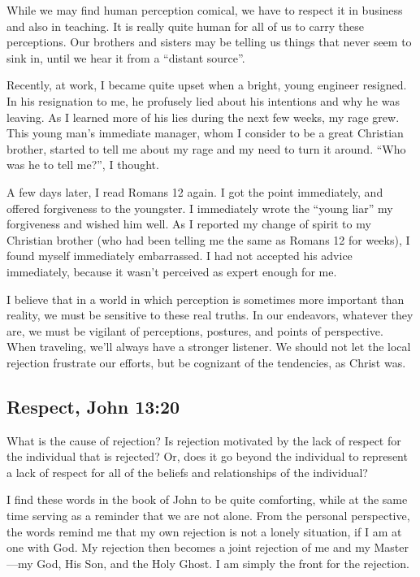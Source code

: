 \documentclass[12pt]{memoir}
\begin{document}
While we may find human perception comical, we have to respect it
in business and also in teaching. It is really quite human for all
of us to carry these perceptions. Our brothers and sisters may be
telling us things that never seem to sink in, until we hear it from
a ``distant source''.

Recently, at work, I became quite upset when a bright, young engineer resigned. In his resignation to me, he profusely lied about his intentions and why he was leaving. As I learned more of his lies during the next few weeks, my rage grew. This young man's immediate manager, whom I consider to be a great Christian brother, started to tell me about my rage and my need to turn it around. ``Who was he to tell me?'', I thought.

A few days later, I read Romans 12 again. I got the point immediately, and offered forgiveness to the youngster. I immediately wrote the ``young liar'' my forgiveness and wished him well. As I reported my change of spirit to my Christian brother (who had been telling me the same as Romans 12 for weeks), I found myself immediately embarrassed. I had not accepted his advice immediately, because it wasn't perceived as expert enough for me.

I believe that in a world in which perception is sometimes more important than reality, we must be sensitive to these real truths. In
our endeavors, whatever they are, we must be vigilant of perceptions, postures, and points of perspective. When traveling, we'll always have
a stronger listener. We should not let the local rejection frustrate our efforts, but be cognizant of the tendencies, as Christ was. 

\subsection[Respect]{Respect, John 13:20}


What is the cause of rejection? Is rejection motivated by the lack of respect for the individual that is rejected? Or, does it go beyond the individual to represent a lack of respect for all of the beliefs
and relationships of the individual?

I find these words in the book of John to be quite comforting, while at the same time serving as a reminder that we are not alone. From the personal perspective, the words remind me that my own rejection is not a lonely
situation, if I am at one with God. My rejection then becomes
a joint rejection of me and my Master---my God, His Son, and the
Holy Ghost. I am simply the front for the rejection. 
\end{document}
